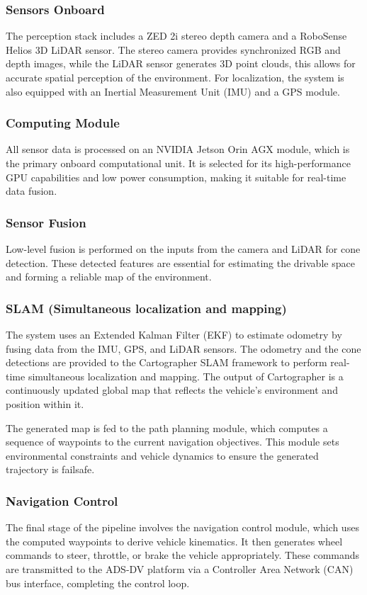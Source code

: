 \documentclass[conference]{IEEEtran}
\begin{document}
\subsubsection{Sensors Onboard}
The perception stack includes a ZED 2i stereo depth camera and a RoboSense Helios 3D LiDAR sensor. The stereo camera provides synchronized RGB and depth images, while the LiDAR sensor generates 3D point clouds, this allows for accurate spatial perception of the environment. For localization, the system is also equipped with an Inertial Measurement Unit (IMU) and a GPS module. 

\subsubsection{Computing Module}
All sensor data is processed on an NVIDIA Jetson Orin AGX module, which is the primary onboard computational unit. It is selected for its high-performance GPU capabilities and low power consumption, making it suitable for real-time data fusion. 

\subsubsection{Sensor Fusion}
Low-level fusion is performed on the inputs from the camera and LiDAR for cone detection. These detected features are essential for estimating the drivable space and forming a reliable map of the environment.  

\subsubsection{SLAM (Simultaneous localization and mapping)}
The system uses an Extended Kalman Filter (EKF) to estimate odometry by fusing data from the IMU, GPS, and LiDAR sensors. The odometry and the cone detections are provided to the Cartographer SLAM framework to perform real-time simultaneous localization and mapping. The output of Cartographer is a continuously updated global map that reflects the vehicle’s environment and position within it. 

The generated map is fed to the path planning module, which computes a sequence of waypoints to the current navigation objectives. This module sets environmental constraints and vehicle dynamics to ensure the generated trajectory is failsafe. 

\subsubsection{Navigation Control}
The final stage of the pipeline involves the navigation control module, which uses the computed waypoints to derive vehicle kinematics. It then generates wheel commands to steer, throttle, or brake the vehicle appropriately. These commands are transmitted to the ADS-DV platform via a Controller Area Network (CAN) bus interface, completing the control loop.
\end{document}
